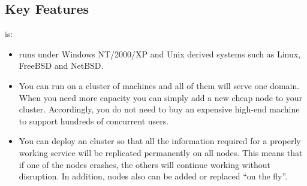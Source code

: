 \newpage
\subsection{Key Features}
\label{sec:keyfeatures}


\ejabberd{} is:
\begin{itemize}
\item {} \ejabberd{} runs under Windows NT/2000/XP and Unix derived systems such as Linux, FreeBSD and NetBSD.

\item {} You can run \ejabberd{} on a cluster of machines and all of them will serve one \Jabber{} domain. When you need more capacity you can simply add a new cheap node to your cluster. Accordingly, you do not need to buy an expensive high-end machine to support hundreds of concurrent users.

\item {} You can deploy an \ejabberd{} cluster so that all the information required for a properly working service will be replicated permanently on all nodes. This means that if one of the nodes crashes, the others will continue working without disruption. In addition, nodes also can be added or replaced ``on the fly''.
  

\end{itemize}
